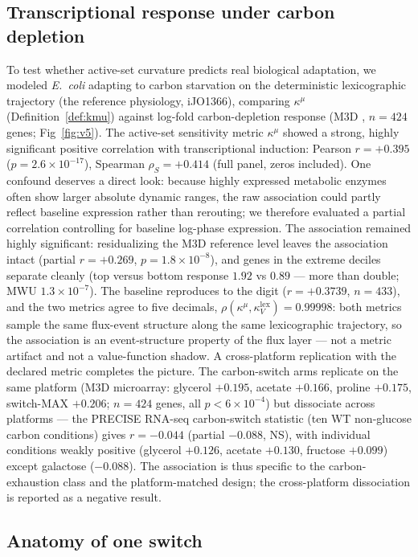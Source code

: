 \documentclass[11pt,a4paper]{article}
\theoremstyle{plain}
\theoremstyle{definition}
\theoremstyle{remark}
\newcommand{\kk}{\kappa_{\!V}}
\newcommand{\kmu}{\kappa^{\mu}}
\begin{document}
\subsection{Transcriptional response under carbon depletion}
\label{sec:v5}
To test whether active-set curvature predicts real biological
adaptation, we modeled \emph{E.~coli} adapting to carbon starvation on
the deterministic lexicographic trajectory (the reference physiology,
iJO1366), comparing $\kmu$ (Definition~\ref{def:kmu}) against
log-fold carbon-depletion response (M3D \citep{faith2008}, $n = 424$
genes; Fig~\ref{fig:v5}). The active-set sensitivity metric $\kmu$
showed a strong, highly significant positive correlation with
transcriptional induction: Pearson
$r = +0.395$ ($p = 2.6 \times 10^{-17}$), Spearman
$\rho_S = +0.414$ (full panel, zeros included). One confound
deserves a direct look: because highly expressed metabolic enzymes
often show larger absolute dynamic ranges, the raw association could
partly reflect baseline expression rather than rerouting; we
therefore evaluated a partial correlation controlling for baseline
log-phase expression. The association remained highly significant:
residualizing the M3D reference level leaves the association intact
(partial $r = +0.269$, $p = 1.8 \times 10^{-8}$), and genes in the
extreme deciles separate cleanly (top versus bottom response $1.92$
vs $0.89$ --- more than double; MWU $1.3 \times 10^{-7}$). The baseline reproduces to the
digit ($r = +0.3739$, $n = 433$), and the two metrics agree to
five decimals, $\rho(\kmu, \kk^{\mathrm{lex}}) = 0.99998$: both
metrics sample the
same flux-event structure along the same lexicographic trajectory,
so the association is an event-structure property of the flux layer ---
not a metric artifact and not a value-function shadow. A
cross-platform replication with the declared metric completes the
picture. The carbon-switch arms replicate on the same platform (M3D
microarray: glycerol $+0.195$, acetate $+0.166$, proline $+0.175$,
switch-MAX $+0.206$; $n = 424$ genes, all $p < 6 \times 10^{-4}$)
but dissociate across platforms --- the PRECISE RNA-seq
carbon-switch statistic (ten WT non-glucose carbon conditions)
gives $r = -0.044$ (partial $-0.088$, NS), with individual
conditions weakly positive (glycerol $+0.126$, acetate $+0.130$,
fructose $+0.099$) except galactose ($-0.088$). The association is
thus specific to the carbon-exhaustion class and the platform-matched
design; the cross-platform dissociation is reported as a negative
result.

\subsection{Anatomy of one switch}\label{sec:anatomy}
\end{document}
